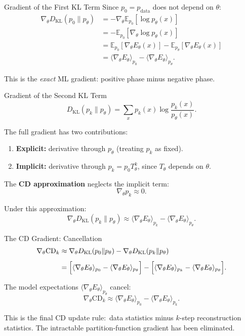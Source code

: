 \documentclass[aspectratio=169]{beamer}
\newcommand{\E}{\mathbb{E}}
\newcommand{\pdata}{p_{\mathrm{data}}}
\newcommand{\pmodel}{p_{\theta}}
\newcommand{\DKL}{D_{\mathrm{KL}}}
\begin{document}
\begin{frame}{Gradient of the First KL Term}
Since $p_0 = \pdata$ does not depend on $\theta$:
\begin{align*}
  \nabla_\theta\DKL(p_0\|\pmodel)
  &= -\nabla_\theta\E_{p_0}[\log\pmodel(x)] \\
  &= -\E_{p_0}[\nabla_\theta\log\pmodel(x)] \\
  &= \E_{p_0}[\nabla_\theta E_\theta(x)]
     - \E_{\pmodel}[\nabla_\theta E_\theta(x)] \\
  &= \langle\nabla_\theta E_\theta\rangle_{p_0}
     - \langle\nabla_\theta E_\theta\rangle_{\pmodel}.
\end{align*}

This is the \emph{exact} ML gradient: positive phase minus negative phase.
\end{frame}

\begin{frame}{Gradient of the Second KL Term}
\[
  \DKL(p_k\|\pmodel)
  = \sum_x p_k(x)\log\frac{p_k(x)}{\pmodel(x)}.
\]

The full gradient has two contributions:
\begin{enumerate}
  \item \textbf{Explicit:} derivative through $\pmodel$ (treating $p_k$ as fixed).
  \item \textbf{Implicit:} derivative through $p_k = p_0 T_\theta^k$, since
        $T_\theta$ depends on $\theta$.
\end{enumerate}

The \textbf{CD approximation} neglects the implicit term:
\[
  \nabla_\theta p_k \approx 0.
\]

Under this approximation:
\[
  \nabla_\theta\DKL(p_k\|\pmodel)
  \approx
  \langle\nabla_\theta E_\theta\rangle_{p_k}
  - \langle\nabla_\theta E_\theta\rangle_{\pmodel}.
\]
\end{frame}

\begin{frame}{The CD Gradient: Cancellation}
\begin{align*}
  \nabla_\theta\mathrm{CD}_k
  &\approx
  \nabla_\theta\DKL(p_0\|\pmodel)
  -
  \nabla_\theta\DKL(p_k\|\pmodel) \\[4pt]
  &=
  \Bigl[\langle\nabla_\theta E_\theta\rangle_{p_0}
         - \langle\nabla_\theta E_\theta\rangle_{\pmodel}\Bigr]
  -
  \Bigl[\langle\nabla_\theta E_\theta\rangle_{p_k}
         - \langle\nabla_\theta E_\theta\rangle_{\pmodel}\Bigr].
\end{align*}

The model expectations $\langle\nabla_\theta E_\theta\rangle_{\pmodel}$ cancel:
\[
  \boxed{
    \nabla_\theta\mathrm{CD}_k
    \approx
    \langle\nabla_\theta E_\theta\rangle_{p_0}
    -
    \langle\nabla_\theta E_\theta\rangle_{p_k}.
  }
\]

This is the final CD update rule:\ data statistics minus $k$-step
reconstruction statistics.  The intractable partition-function gradient
has been eliminated.
\end{frame}
\end{document}
